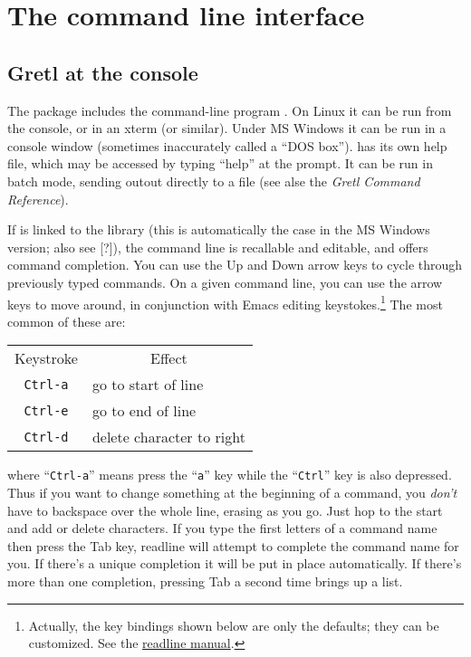 \chapter{The command line interface}
\label{cli}



\section{Gretl at the console}
\label{cli-console}


The  package includes the command-line program
. On Linux it can be run from the console, or in an
xterm (or similar).  Under MS Windows it can be run in a console
window (sometimes inaccurately called a ``DOS box'').  
has its own help file, which may be accessed by typing ``help'' at the
prompt. It can be run in batch mode, sending outout directly to a file
(see alse the \emph{Gretl Command Reference}).
    
If  is linked to the  library (this is
automatically the case in the MS Windows version; also see [?]), the
command line is recallable and editable, and offers command
completion.  You can use the Up and Down arrow keys to cycle through
previously typed commands.  On a given command line, you can use the
arrow keys to move around, in conjunction with Emacs editing
keystokes.\footnote{Actually, the key bindings shown below are only
  the defaults; they can be customized.  See the
  \href{http://cnswww.cns.cwru.edu/~chet/readline/readline.html}{readline
    manual}.} The most common of these are:
%    
\begin{center}
  \begin{tabular}{cl}
    Keystroke & \multicolumn{1}{c}{Effect}\\
    \verb+Ctrl-a+ & go to start of line\\
    \verb+Ctrl-e+ & go to end of line\\
    \verb+Ctrl-d+ & delete character to right\\
  \end{tabular}
\end{center}
%
where ``\verb+Ctrl-a+'' means press the ``\verb+a+'' key while the
``\verb+Ctrl+'' key is also depressed.  Thus if you want to change
something at the beginning of a command, you \emph{don't} have to
backspace over the whole line, erasing as you go.  Just hop to the
start and add or delete characters.  If you type the first letters of
a command name then press the Tab key, readline will attempt to
complete the command name for you.  If there's a unique completion it
will be put in place automatically.  If there's more than one
completion, pressing Tab a second time brings up a list.

